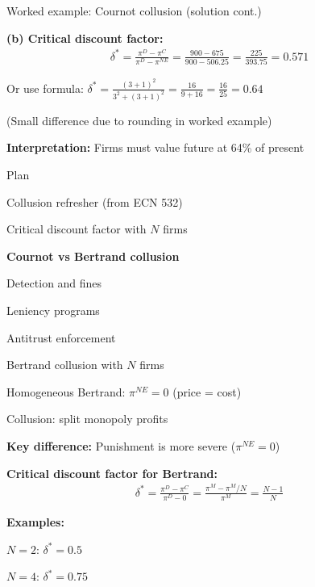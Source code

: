 \documentclass[notes,11pt, aspectratio=169]{beamer}
\newenvironment{wideitemize}{\itemize\addtolength{\itemsep}{10pt}}{\enditemize}
\newenvironment{wideenumerate}{\enumerate\addtolength{\itemsep}{10pt}}{\endenumerate}
\begin{document}
\begin{frame}{Worked example: Cournot collusion (solution cont.)}
	\begin{wideitemize}
		\item \textbf{(b) Critical discount factor:}
		\begin{align*}
			\delta^* = \frac{\pi^D - \pi^C}{\pi^D - \pi^{NE}} = \frac{900 - 675}{900 - 506.25} = \frac{225}{393.75} = 0.571
		\end{align*}
		\item Or use formula: $\delta^* = \frac{(3+1)^2}{3^2 + (3+1)^2} = \frac{16}{9+16} = \frac{16}{25} = 0.64$
		\item (Small difference due to rounding in worked example)
		\item \textbf{Interpretation:} Firms must value future at 64\% of present
	\end{wideitemize}
\end{frame}

\begin{frame}{Plan}
  \begin{wideenumerate}
    \item Collusion refresher (from ECN 532)
    \item Critical discount factor with $N$ firms
    \item \textbf{Cournot vs Bertrand collusion}
    \item Detection and fines
    \item Leniency programs
    \item Antitrust enforcement
  \end{wideenumerate}
\end{frame}

\begin{frame}{Bertrand collusion with $N$ firms}
	\begin{wideitemize}
		\item Homogeneous Bertrand: $\pi^{NE} = 0$ (price = cost)
		\item Collusion: split monopoly profits
		\item \textbf{Key difference:} Punishment is more severe ($\pi^{NE} = 0$)
		\item \textbf{Critical discount factor for Bertrand:}
		\begin{align*}
			\delta^* = \frac{\pi^D - \pi^C}{\pi^D - 0} = \frac{\pi^M - \pi^M/N}{\pi^M} = \frac{N-1}{N}
		\end{align*}
		\item \textbf{Examples:}
		\begin{wideitemize}
			\vspace{5pt}
			\item $N = 2$: $\delta^* = 0.5$
			\item $N = 4$: $\delta^* = 0.75$
		\end{wideitemize}
	\end{wideitemize}
\end{frame}
\end{document}
